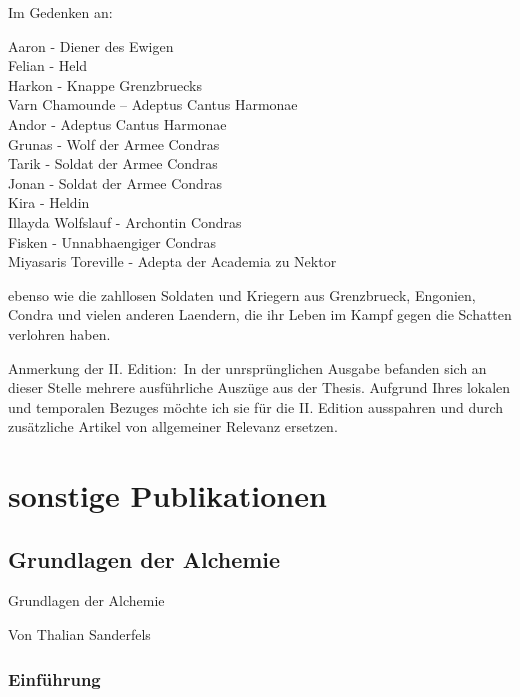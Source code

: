 \documentclass[a5paper,8pt]{book}
\begin{document}
\begin{center}
\begin{Huge}Im Gedenken an:\\\end{Huge}

\vspace{10mm}

Aaron - Diener des Ewigen\\
Felian - Held\\
Harkon - Knappe Grenzbruecks\\
Varn Chamounde – Adeptus Cantus Harmonae\\
Andor - Adeptus Cantus Harmonae\\
Grunas - Wolf der Armee Condras\\
Tarik - Soldat der Armee Condras\\
Jonan - Soldat der Armee Condras\\
Kira - Heldin\\
Illayda Wolfslauf - Archontin Condras\\
Fisken - Unnabhaengiger Condras\\
Miyasaris Toreville - Adepta der Academia zu Nektor\\
\end{center}

ebenso wie die zahllosen Soldaten und Kriegern aus Grenzbrueck, Engonien, Condra und vielen anderen Laendern, die ihr Leben im Kampf gegen die Schatten verlohren haben.

Anmerkung der II. Edition:\
In der unrsprünglichen Ausgabe befanden sich an dieser Stelle mehrere ausführliche Auszüge aus der Thesis. Aufgrund Ihres lokalen und temporalen Bezuges möchte ich sie
für die II. Edition ausspahren und durch zusätzliche Artikel von allgemeiner Relevanz ersetzen.


\newpage



\chapter{sonstige Publikationen}

\section{Grundlagen der Alchemie}


Grundlagen der Alchemie


Von Thalian Sanderfels

\subsection{Einführung}
\end{document}
